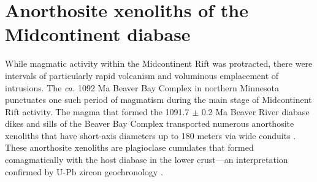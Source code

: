\documentclass[9pt,twocolumn,twoside,lineno]{pnas-new}
\begin{document}

\section*{Anorthosite xenoliths of the Midcontinent diabase}

While magmatic activity within the Midcontinent Rift was protracted, there were intervals of particularly rapid volcanism and voluminous emplacement of intrusions. The \textit{ca.} 1092 Ma Beaver Bay Complex in northern Minnesota punctuates one such period of magmatism during the main stage of Midcontinent Rift activity. The magma that formed the 1091.7 $\pm$ 0.2 Ma Beaver River diabase dikes and sills of the Beaver Bay Complex transported numerous anorthosite xenoliths that have short-axis diameters up to 180 meters via wide conduits \cite{Boerboom2004a, Boerboom2006b}. These anorthosite xenoliths are plagioclase cumulates that formed comagmatically with the host diabase in the lower crust---an interpretation confirmed by U-Pb zircon geochronology \cite{Zhang2021b}. 
\end{document}
